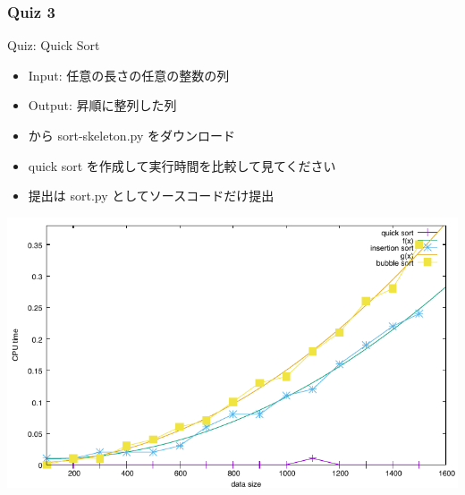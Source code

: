 \begin{frame}[shrink]
\frametitle{Quiz 3}
  \begin{block}{Quiz: Quick Sort}
\scriptsize
    \begin{itemize}
\item Input: 任意の長さの任意の整数の列
\item Output: 昇順に整列した列
\item \href{https://sites.google.com/presystems.xyz/elementaryCS/}{} から sort-skeleton.py をダウンロード
\item quick sort を作成して実行時間を比較して見てください
\item 提出は sort.py としてソースコードだけ提出
    \end{itemize}
  \end{block}
  \begin{center}
\includegraphics[scale=0.6]{./progs/sort.pdf}
  \end{center}
\end{frame}
